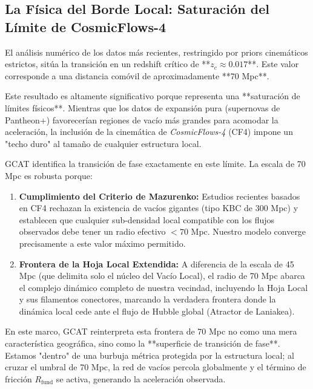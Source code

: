 \documentclass[12pt, a4paper]{article}
\theoremstyle{plain}
\theoremstyle{definition}
\begin{document}
\subsection{La Física del Borde Local: Saturación del Límite de CosmicFlows-4}

El análisis numérico de los datos más recientes, restringido por priors cinemáticos estrictos, sitúa la transición en un redshift crítico de **$z_c \approx 0.017$**. Este valor corresponde a una distancia comóvil de aproximadamente **70 Mpc**.

Este resultado es altamente significativo porque representa una **saturación de límites físicos**. Mientras que los datos de expansión pura (supernovas de Pantheon+) favorecerían regiones de vacío más grandes para acomodar la aceleración, la inclusión de la cinemática de \textit{CosmicFlows-4} (CF4) impone un "techo duro" al tamaño de cualquier estructura local.

GCAT identifica la transición de fase exactamente en este límite. La escala de 70 Mpc es robusta porque:

\begin{enumerate}
    \item \textbf{Cumplimiento del Criterio de Mazurenko:} Estudios recientes basados en CF4 \cite{Mazurenko2024} rechazan la existencia de vacíos gigantes (tipo KBC de 300 Mpc) y establecen que cualquier sub-densidad local compatible con los flujos observados debe tener un radio efectivo $< 70$ Mpc. Nuestro modelo converge precisamente a este valor máximo permitido.
    
    \item \textbf{Frontera de la Hoja Local Extendida:} A diferencia de la escala de 45 Mpc (que delimita solo el núcleo del Vacío Local), el radio de 70 Mpc abarca el complejo dinámico completo de nuestra vecindad, incluyendo la Hoja Local y sus filamentos conectores, marcando la verdadera frontera donde la dinámica local cede ante el flujo de Hubble global (Atractor de Laniakea).
\end{enumerate}



En este marco, GCAT reinterpreta esta frontera de 70 Mpc no como una mera característica geográfica, sino como la **superficie de transición de fase**. Estamos "dentro" de una burbuja métrica protegida por la estructura local; al cruzar el umbral de 70 Mpc, la red de vacíos percola globalmente y el término de fricción $R_{\text{fund}}$ se activa, generando la aceleración observada.
\end{document}
